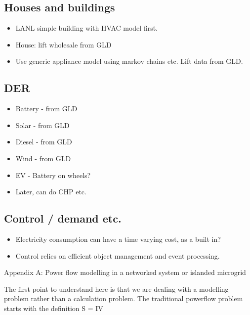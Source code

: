 \documentclass[12pt]{article}
\newcommand{\itm}[1]{\begin{itemize}#1\end{itemize}}
\begin{document}
\subsection{Houses and buildings}
\itm{
	\item LANL simple building with HVAC model first.
	\item House: lift wholesale from GLD
	\item Use generic appliance model using markov chains etc. Lift data from GLD.
}
\subsection{DER}
\itm{
	\item Battery - from GLD
	\item Solar - from GLD
	\item Diesel - from GLD
	\item Wind - from GLD
	\item EV - Battery on wheels?
	\item Later, can do CHP etc.
}
\subsection{Control / demand etc.}
\itm{
	\item Electricity consumption can have a time varying cost, as a built in?
	\item Control relies on efficient object management and event processing.
}

Appendix A: Power flow modelling in a networked system or islanded microgrid

The first point to understand here is that we are dealing with a modelling problem rather than a calculation problem. The traditional powerflow problem starts with the definition S = IV
\end{document}
